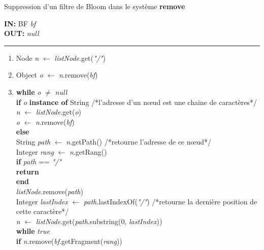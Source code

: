 \documentclass[a4paper,11pt]{report}
\begin{document}
\begin{algorithme}
	Suppression d'un filtre de Bloom dans le système \textbf{remove}
\end{algorithme}

\begin{flushleft}
	\begin{framed}
		\textbf{IN:} BF \textit{bf} \\
		\textbf{OUT:} \textit{null}\\
		\noindent\rule{\linewidth}{0.5pt}

		\begin{enumerate}
			\item Node \textit{n} $\leftarrow$ \textit{listNode}.get(\textit{"/"})
			\item Object \textit{o} $\leftarrow$ \textit{n}.remove(\textit{bf})
			\item
				\begin{tabbing}
					\textbf{wh}\=\textbf{ile }\textit{o} $\neq$ \textit{null}\\
						\> \textbf{if }\= \textit{o} \textbf{instance of} String /*l'adresse d'un nœud est une chaine de caractères*/\\
						\> \> \textit{n} $\leftarrow$ \textit{listNode}.get(\textit{o})\\
						\> \> \textit{o} $\leftarrow$ \textit{n}.remove(\textit{bf})\\
						\> \textbf{else}\\
						\> \> String \textit{path} $\leftarrow$ \textit{n}.getPath() /*retourne l'adresse de ce nœud*/\\
						\> \> Integer \textit{rang} $\leftarrow$ \textit{n}.getRang()\\
						\> \> \textbf{if }\= \textit{path} == \textit{"/"}\\
						\> \> \> \textbf{return}\\
						\> \> \textbf{end}\\						
						\> \> \textit{listNode}.remove(\textit{path})\\
						\> \> Integer \textit{lastIndex} $\leftarrow$ \textit{path}.lastIndexOf(\textit{"/"}) /*retourne la dernière position de cette caractère*/\\
						\> \> \textit{n} $\leftarrow$ \textit{listNode}.get(\textit{path}.substring(0, \textit{lastIndex}))\\
						\> \> \textbf{wh}\=\textbf{ile }\textit{true}\\
						\> \> \> \textbf{if }\= \textit{n}.remove(\textit{bf}.getFragment(\textit{rang}))\\

\end{tabbing}
\end{enumerate}
\end{framed}
\end{flushleft}
\end{document}
